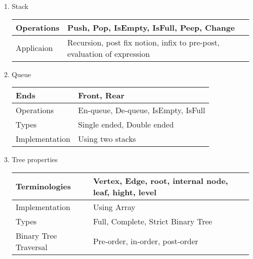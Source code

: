 \begin{enumerate}
    \item Stack \\
        \begin{myTableStyle} \begin{tabular}{ |m{4cm}|m{12cm}| } \hline
                Operations     &     Push, Pop, IsEmpty, IsFull, Peep, Change    \\ \hline
                Applicaion     &     Recursion, post fix notion, infix to pre-post, evaluation of expression    \\ \hline
        \end{tabular} \end{myTableStyle} \vspace{0.08in}

    \item Queue \\
        \begin{myTableStyle} \begin{tabular}{ |m{4cm}|m{12cm}| } \hline
                Ends            &     Front, Rear    \\ \hline
                Operations      &     En-queue, De-queue, IsEmpty, IsFull     \\ \hline
                Types           &     Single ended, Double ended   \\ \hline
                Implementation  &     Using two stacks    \\ \hline
        \end{tabular} \end{myTableStyle} \vspace{0.08in}

    \item Tree properties \\
        \begin{myTableStyle} \begin{tabular}{ |m{4cm}|m{12cm}| } \hline
                Terminologies           &     Vertex, Edge, root, internal node, leaf, hight, level    \\ \hline
                Implementation          &     Using Array    \\ \hline
                Types                   &     Full, Complete, Strict Binary Tree    \\ \hline
                Binary Tree Traversal   &     Pre-order, in-order, post-order    \\ \hline
        \end{tabular} \end{myTableStyle} \vspace{0.08in}


\end{enumerate}
